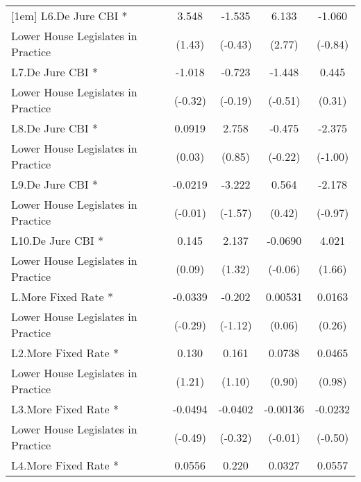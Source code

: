 {\begin{tabular}{l*{4}{c}}
[1em]
L6.De Jure CBI *    &       3.548         &      -1.535         &       6.133\sym{**} &      -1.060         \\
Lower House Legislates in Practice&      (1.43)         &     (-0.43)         &      (2.77)         &     (-0.84)         \\
[1em]
L7.De Jure CBI *    &      -1.018         &      -0.723         &      -1.448         &       0.445         \\
Lower House Legislates in Practice&     (-0.32)         &     (-0.19)         &     (-0.51)         &      (0.31)         \\
[1em]
L8.De Jure CBI *    &      0.0919         &       2.758         &      -0.475         &      -2.375         \\
Lower House Legislates in Practice&      (0.03)         &      (0.85)         &     (-0.22)         &     (-1.00)         \\
[1em]
L9.De Jure CBI *    &     -0.0219         &      -3.222         &       0.564         &      -2.178         \\
Lower House Legislates in Practice&     (-0.01)         &     (-1.57)         &      (0.42)         &     (-0.97)         \\
[1em]
L10.De Jure CBI *   &       0.145         &       2.137         &     -0.0690         &       4.021         \\
Lower House Legislates in Practice&      (0.09)         &      (1.32)         &     (-0.06)         &      (1.66)         \\
[1em]
L.More Fixed Rate * &     -0.0339         &      -0.202         &     0.00531         &      0.0163         \\
Lower House Legislates in Practice&     (-0.29)         &     (-1.12)         &      (0.06)         &      (0.26)         \\
[1em]
L2.More Fixed Rate *&       0.130         &       0.161         &      0.0738         &      0.0465         \\
Lower House Legislates in Practice&      (1.21)         &      (1.10)         &      (0.90)         &      (0.98)         \\
[1em]
L3.More Fixed Rate *&     -0.0494         &     -0.0402         &    -0.00136         &     -0.0232         \\
Lower House Legislates in Practice&     (-0.49)         &     (-0.32)         &     (-0.01)         &     (-0.50)         \\
[1em]
L4.More Fixed Rate *&      0.0556         &       0.220         &      0.0327         &      0.0557         \\

\end{tabular}}
